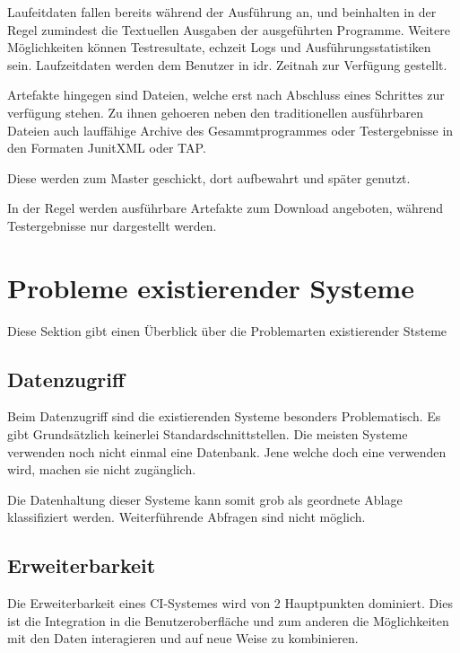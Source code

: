 Laufeitdaten fallen bereits w\"ahrend der Ausf\"uhrung an,
und beinhalten in der Regel zumindest die Textuellen Ausgaben
der ausgef\"uhrten Programme.
Weitere M\"oglichkeiten k\"onnen Testresultate, echzeit Logs und Ausf\"uhrungsstatistiken sein.
Laufzeitdaten werden dem Benutzer in idr. Zeitnah zur Verf\"ugung gestellt.

Artefakte hingegen sind Dateien,
welche erst nach Abschluss eines Schrittes zur verf\"ugung stehen.
Zu ihnen gehoeren neben den traditionellen ausf\"uhrbaren Dateien
auch lauff\"ahige Archive des Gesammtprogrammes oder Testergebnisse in den Formaten JunitXML oder TAP.


Diese werden zum Master geschickt, dort aufbewahrt und sp\"ater genutzt.

In der Regel werden ausf\"uhrbare Artefakte zum Download angeboten,
w\"ahrend Testergebnisse nur dargestellt werden.





\section{Probleme existierender Systeme}

Diese Sektion gibt einen \"Uberblick \"uber die Problemarten existierender Ststeme

\subsection{Datenzugriff}

Beim Datenzugriff sind die existierenden Systeme besonders Problematisch.
Es gibt Grunds\"atzlich keinerlei Standardschnittstellen.
Die meisten Systeme verwenden noch nicht einmal eine Datenbank.
Jene welche doch eine verwenden wird, machen sie nicht zug\"anglich.

Die Datenhaltung dieser Systeme kann somit grob als geordnete Ablage klassifiziert werden. Weiterf\"uhrende Abfragen sind nicht m\"oglich.

\subsection{Erweiterbarkeit}

Die Erweiterbarkeit eines CI-Systemes wird von 2 Hauptpunkten dominiert.
Dies ist die Integration in die Benutzeroberfl\"ache
und zum anderen die M\"oglichkeiten mit den Daten interagieren
und auf neue Weise zu kombinieren.

